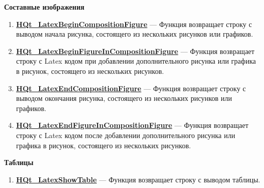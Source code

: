 \documentclass[a4paper,12pt]{article}
\begin{document}
\textbf{Составные изображения}
\begin{enumerate}

\item \textbf{\hyperref[HQt_LatexBeginCompositionFigure]{HQt\_LatexBeginCompositionFigure}} --- Функция возвращает строку с выводом начала рисунка, состоящего из нескольких рисунков или графиков.

\item \textbf{\hyperref[HQt_LatexBeginFigureInCompositionFigure]{HQt\_LatexBeginFigureInCompositionFigure}} --- Функция возвращает строку с Latex кодом при добавлении дополнительного рисунка или графика в рисунок, состоящего из нескольких рисунков.

\item \textbf{\hyperref[HQt_LatexEndCompositionFigure]{HQt\_LatexEndCompositionFigure}} --- Функция возвращает строку с выводом окончания рисунка, состоящего из нескольких рисунков или графиков.

\item \textbf{\hyperref[HQt_LatexEndFigureInCompositionFigure]{HQt\_LatexEndFigureInCompositionFigure}} --- Функция возвращает строку с Latex кодом после добавлении дополнительного рисунка или графика в рисунок, состоящего из нескольких рисунков.

\end{enumerate}

\textbf{Таблицы}
\begin{enumerate}

\item \textbf{\hyperref[HQt_LatexShowTable]{HQt\_LatexShowTable}} --- Функция возвращает строку с выводом таблицы.

\end{enumerate}
\end{document}
